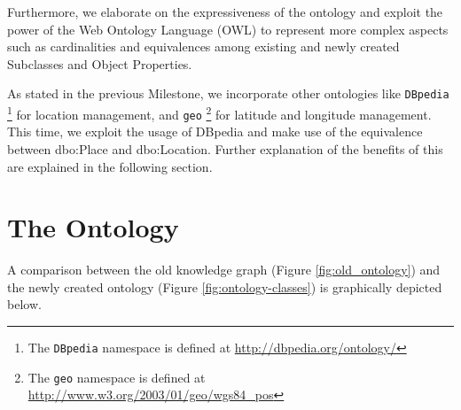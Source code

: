 \documentclass[runningheads,a4paper]{../../StyleFiles/llncs}
\begin{document}
Furthermore, we elaborate on the expressiveness of the ontology and exploit the power of the Web Ontology Language (OWL) to represent more complex aspects such as cardinalities and equivalences among existing and newly created Subclasses and Object Properties.

As stated in the previous Milestone, we incorporate other ontologies like \texttt{DBpedia} \footnote{The \texttt{DBpedia} namespace is defined at \url{http://dbpedia.org/ontology/}} for location management, and \texttt{geo} \footnote{The \texttt{geo} namespace is defined at \url{http://www.w3.org/2003/01/geo/wgs84_pos}} for latitude and longitude management. This time, we exploit the usage of DBpedia and make use of the equivalence between dbo:Place and dbo:Location. Further explanation of the benefits of this are explained in the following section.

\section{The Ontology}
A comparison between the old knowledge graph (Figure \ref{fig:old_ontology}) and the newly created ontology (Figure \ref{fig:ontology-classes}) is graphically depicted below. 
\end{document}
